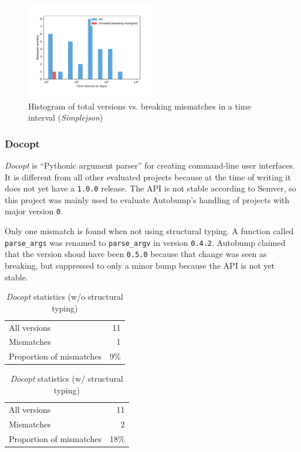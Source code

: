 \documentclass{l4proj}
\newcommand\genericstyle{\lstset{basicstyle=\ttm}}
\newcommand\codeinline[1]{{\genericstyle\lstinline!#1!}}
\begin{document}
\begin{figure}[H]
\centering
\includegraphics[width=0.5\textwidth,height=0.25\textheight]{images/evaluation/simplejson_introduced_changes}
\caption{Histogram of total versions vs. breaking mismatches in a time
interval (\textit{Simplejson})}
\label{SimplejsonHistogram}
\end{figure}

\subsubsection{Docopt}

\textit{Docopt} is ``Pythonic argument parser'' for creating
command-line user interfaces. It is different from all other evaluated
projects because at the time of writing it does not yet have a
\codeinline{1.0.0} release. The API is not stable according to Semver,
so this project was mainly used to evaluate Autobump's handling of
projects with major version \codeinline{0}.

Only one mismatch is found when not using structural typing. A
function called \codeinline{parse_args} was renamed to
\codeinline{parse_argv} in version \codeinline{0.4.2}. Autobump
claimed that the version shoud have been \codeinline{0.5.0} because
that change was seen as breaking, but suppressed to only a minor bump
because the API is not yet stable.

\noindent
\begin{minipage}[t]{0.5\textwidth}
\begin{table}[H]
\centering
\begin{tabular}{|lr|}
All versions & 11 \\
Mismatches & 1 \\
Proportion of mismatches & 9\% \\
\end{tabular}
\caption{\textit{Docopt} statistics (w/o structural typing)}
\label{DocoptNonStructural}
\end{table}
\end{minipage}
\begin{minipage}[t]{0.5\textwidth}
\begin{table}[H]
\centering
\begin{tabular}{|lr|}
All versions & 11 \\
Mismatches & 2 \\
Proportion of mismatches & 18\% \\
\end{tabular}
\caption{\textit{Docopt} statistics (w/ structural typing)}
\label{DocoptStructural}
\end{table}
\end{minipage}
\end{document}
